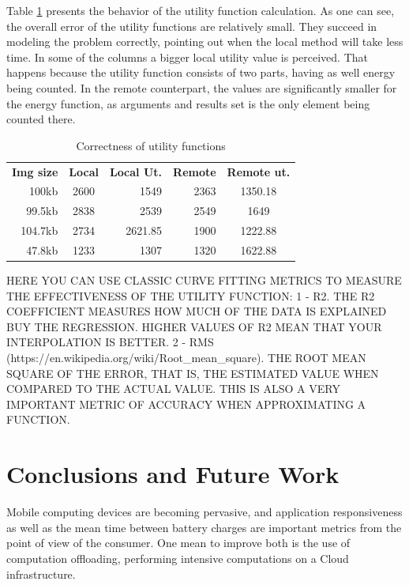 \documentclass[10pt, conference, letterpaper]{IEEEtran}
\begin{document}
Table \ref{table:correctness} presents the behavior of the utility function calculation.  As one can see, the overall error of the utility functions are relatively small. They succeed in modeling the problem correctly, pointing out when the local method will take less time. In some of the columns a bigger local utility value is perceived. That happens because the utility function consists of two parts, having as well energy being counted. In the remote counterpart, the values are significantly smaller for the energy function, as arguments and results set is the only element being counted there.


  \begin{table}[!t]
  \centering
  \caption{Correctness of utility functions}
  \label{table:correctness}
  \begin{tabular}{rcrrc}
    \textbf{ Img size } & \textbf{Local} & \textbf{Local Ut.} & \textbf{Remote} & \textbf{Remote ut.} \\
   100kb & 2600 & 1549 & 2363 & 1350.18 \\
   99.5kb & 2838  & 2539 & 2549 & 1649 \\
   104.7kb & 2734  & 2621.85 & 1900 & 1222.88 \\
   47.8kb & 1233  & 1307 & 1320 & 1622.88
  \end{tabular}
  \end{table}

{\color{red} HERE YOU CAN USE CLASSIC CURVE FITTING METRICS TO MEASURE THE EFFECTIVENESS OF THE UTILITY FUNCTION: 1 - R2. THE R2 COEFFICIENT MEASURES HOW MUCH OF THE DATA IS EXPLAINED BUY THE REGRESSION. HIGHER VALUES OF R2 MEAN THAT YOUR INTERPOLATION IS BETTER. 2 - RMS (https://en.wikipedia.org/wiki/Root\_mean\_square). THE ROOT MEAN SQUARE OF THE ERROR, THAT IS, THE ESTIMATED VALUE WHEN COMPARED TO THE ACTUAL VALUE. THIS IS ALSO A VERY IMPORTANT METRIC OF ACCURACY WHEN APPROXIMATING A FUNCTION.}

\section{Conclusions and Future Work}
\label{sec:conclusion}

Mobile computing devices are becoming pervasive, and application responsiveness as well as the mean time between battery charges are important metrics from the point of view of the consumer. One mean to improve both is the use of computation offloading, performing intensive computations on a Cloud infrastructure.
\end{document}
